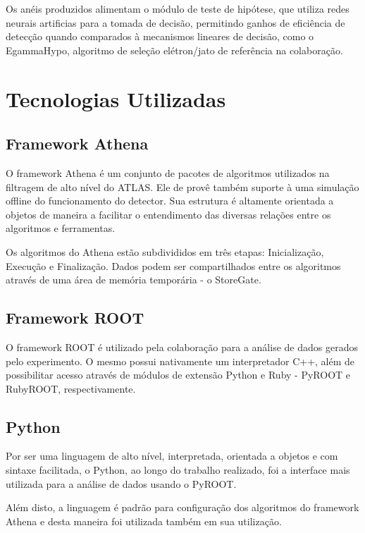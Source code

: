 \documentclass[a4paper,10pt,titlepage]{article}
\begin{document}
Os anéis produzidos alimentam o módulo de teste de hipótese, que utiliza redes neurais artificias para a tomada de decisão, permitindo ganhos de eficiência de detecção quando comparados à mecanismos lineares de decisão, como o EgammaHypo, algoritmo de seleção elétron/jato de referência na colaboração.

\clearpage

\section{Tecnologias Utilizadas}

\subsection{Framework Athena}

O framework Athena é um conjunto de pacotes de algoritmos utilizados na filtragem de alto nível do ATLAS. Ele de provê também suporte à uma simulação offline do funcionamento do detector.
Sua estrutura é altamente orientada a objetos de maneira a facilitar o entendimento das diversas relações entre os algoritmos e ferramentas.

Os algoritmos do Athena estão subdivididos em três etapas: Inicialização, Execução e Finalização.
Dados podem ser compartilhados entre os algoritmos através de uma área de memória temporária - o StoreGate.

\subsection{Framework ROOT}

O framework ROOT é utilizado pela colaboração para a análise de dados gerados pelo experimento.
O mesmo possui nativamente um interpretador C++, além de possibilitar acesso através de módulos de extensão Python e Ruby - PyROOT e RubyROOT, respectivamente.

\subsection{Python}

Por ser uma linguagem de alto nível, interpretada, orientada a objetos e com sintaxe facilitada, o Python, ao longo do trabalho realizado, foi a interface mais utilizada para a análise de dados usando o PyROOT.

Além disto, a linguagem é padrão para configuração dos algoritmos do framework Athena e desta maneira foi utilizada também em sua utilização.
\end{document}
